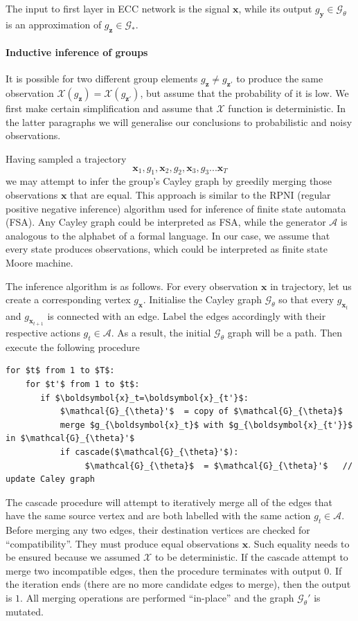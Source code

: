 \documentclass[12pt]{article}
\begin{document}
The input to first layer in ECC network is the signal $\boldsymbol{x}$, while its output $g_{\boldsymbol{y}}\in\mathcal{G}_{\theta}$ is an approximation of $g_{\boldsymbol{z}}\in\mathcal{G}_{*}$. 

\paragraph{Inductive inference of groups}

It is possible for two different group elements $g_{\boldsymbol{z}}\ne g_{\boldsymbol{z}'}$ to produce the same observation $\mathcal{X}(g_{\boldsymbol{z}})=\mathcal{X}(g_{\boldsymbol{z}'})$, but assume that the probability of it is low. We first make certain simplification and assume that $\mathcal{X}$ function is deterministic. In the latter paragraphs we will generalise our conclusions to probabilistic and noisy observations.

Having sampled a trajectory
\[\boldsymbol{x}_1,g_1,\boldsymbol{x}_2,g_2,\boldsymbol{x}_3,g_3...\boldsymbol{x}_T\] 
we may attempt to infer the group's Cayley graph by greedily merging those observations $\boldsymbol{x}$ that are equal. This approach is similar to the RPNI (regular positive negative inference) algorithm used for inference of finite state automata (FSA). Any Cayley graph could be interpreted as FSA, while the generator $\mathcal{A}$ is analogous to the alphabet of a formal language. In our case, we assume that every state produces observations, which could be interpreted as finite state Moore machine. 

The inference algorithm is as follows. For every observation $\boldsymbol{x}$ in trajectory, let us create a corresponding vertex $g_{\boldsymbol{x}}$. Initialise the Cayley graph $\mathcal{G}_{\theta}$ so that every $g_{\boldsymbol{x}_t}$ and $g_{\boldsymbol{x}_{t+1}}$ is connected with an edge. Label the edges accordingly with their respective actions $g_{t}\in\mathcal{A}$. As a result, the initial  $\mathcal{G}_{\theta}$ graph will be a path. Then execute the following procedure
\begin{lstlisting}
for $t$ from 1 to $T$:
    for $t'$ from 1 to $t$:
       if $\boldsymbol{x}_t=\boldsymbol{x}_{t'}$:
           $\mathcal{G}_{\theta}'$  = copy of $\mathcal{G}_{\theta}$ 
           merge $g_{\boldsymbol{x}_t}$ with $g_{\boldsymbol{x}_{t'}}$ in $\mathcal{G}_{\theta}'$
           if cascade($\mathcal{G}_{\theta}'$):
                $\mathcal{G}_{\theta}$  = $\mathcal{G}_{\theta}'$   // update Caley graph  
\end{lstlisting}
The cascade procedure will attempt to iteratively merge all of the edges that have the same source vertex and are both labelled with the same action $g_{t}\in\mathcal{A}$. Before merging any two edges, their destination vertices are checked for ``compatibility''. They must produce equal observations $\boldsymbol{x}$. Such equality needs to be ensured because we assumed $\mathcal{X}$ to be deterministic. If the cascade attempt to merge two incompatible edges, then the procedure terminates with output $0$. If the iteration ends (there are no more candidate edges to merge), then the output is $1$. All merging operations are performed ``in-place'' and the graph  $\mathcal{G}_{\theta}'$ is mutated.
\end{document}
